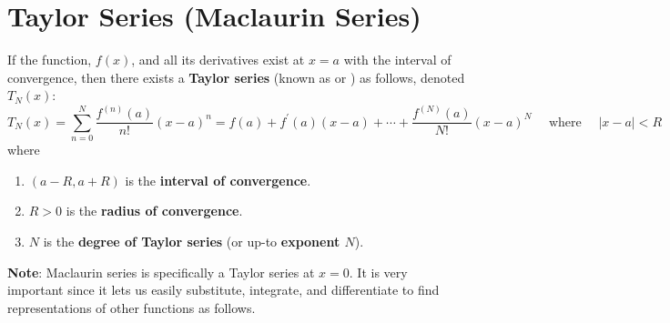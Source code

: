 \newpage






\begin{algorithm}
\caption{Convergence Test of a Series $\sum a_n$}
\label{alg:convergence_test}
\begin{algorithmic}[1]
  \State
    \Return {}
  \State
    \Return {}
  \State
    \Return {}
  \State
    \Return {}
  \State
    \Return {}
    \State
    \Return {}
  \Else
    \State
    \Return {}
  \EndIf
  \EndFunction
\end{algorithmic}
\end{algorithm}









\newpage


\section*{Taylor Series (Maclaurin Series)}
If the function, $f(x)$, and all its derivatives exist at $x=a$ with the 
interval of convergence, then there exists a \textbf{Taylor series} 
(known as  or ) 
as follows, denoted $T_{N}(x)$:
$$
T_{N}(x)=\sum_{n=0}^{N} \frac{f^{(n)}(a)}{n!}(x-a)^{n}=f(a)+f^{\prime}(a)(x-a)+\cdots+\frac{f^{(N)}(a)}{N!}(x-a)^{N} \quad \text { where } \quad|x-a|<R
$$
where
\begin{enumerate}
\item $(a-R, a+R)$ is the \textbf{interval of convergence}.
\item $R>0$ is the \textbf{radius of convergence}.
\item $N$ is the \textbf{degree of Taylor series} (or up-to \textbf{exponent $N$}).
\end{enumerate}
\textbf{Note}: Maclaurin series is specifically a Taylor series at $x=0$. It is very important since it lets us easily substitute, integrate, and differentiate to find representations of other functions as follows.


